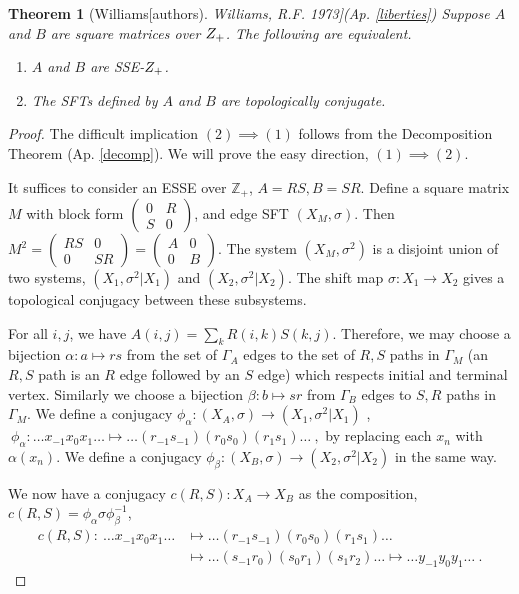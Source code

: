 \documentclass{amsart}
\newcommand{\si}{\index}
\newcommand{\ai}{\index[authors]}
\newtheorem{thm}[equation]{Theorem}
\theoremstyle{definition}
\theoremstyle{definition}
\newcommand{\apr}{(Ap. \ref}
\newcommand{\Z}{\mathbb Z}
\numberwithin{equation}{subsection}
\begin{document}
 \begin{thm}[Williams\ai{Williams, R.F.} 1973]\label{rfwtheorem} \apr{liberties}) Suppose
 $A$ and $B$ are square matrices over $\mathcal \Z_+$. The following
are equivalent.
\begin{enumerate}
\item  $A$ and $B$ are SSE-$\mathcal \Z_+$.

\item The SFTs defined by $A$ and $B$ are topologically conjugate.
\end{enumerate}
\end{thm}
\begin{proof}
The  difficult implication $(2) \implies (1)$ follows from
the Decomposition Theorem\si{Decomposition Theorem} \apr{decomp}).
We will prove the easy direction,
$(1) \implies (2)$.

It suffices to consider
 an ESSE over $\Z_+$,
   $A=RS, B=SR$. Define a square matrix $M$ with block form
   $\begin{pmatrix} 0&R \\ S&0\end{pmatrix}$,
     and  edge SFT $(X_M, \sigma)$.
Then $M^2 =
     \begin{pmatrix} RS&0 \\ 0&SR\end{pmatrix}
=    \begin{pmatrix} A&0 \\ 0&B\end{pmatrix}
  $.
  The system $(X_M, \sigma^2)$ is a disjoint union of two systems,
  $(X_1, \sigma^2|{X_1})$ and   $(X_2, \sigma^2|{X_2})$.
The shift map
  $\sigma: X_1 \to X_2$ gives a
  topological conjugacy between these subsystems.

For all $i,j$, we have $A(i,j)= \sum_k R(i,k)S(k,j)$.
Therefore, we may choose a bijection $\alpha: a\mapsto rs$ from the set of
$\Gamma_A$ edges to the set of $R,S $ paths in $\Gamma_M$
(an $R,S$ path is an $R$ edge followed
by an $S$ edge) which respects initial and terminal vertex.
Similarly we choose a bijection
$\beta: b\mapsto sr$
from $\Gamma_B$ edges to $S,R$ paths in $\Gamma_M$.
  We define a  conjugacy
$\phi_{\alpha}: (X_A, \sigma ) \to (X_1, \sigma^2|{X_1})$ ,
$\
\phi_{\alpha} :
  \dots x_{-1}x_0x_1 \dots  \mapsto
  \dots (r_{-1}s_{-1})(r_0s_0)(r_1s_1) \dots \ ,
 $
  by replacing
  each $x_n$ with $\alpha (x_n)$.
    We define a  conjugacy
  $\phi_{\beta}: (X_B, \sigma ) \to (X_2, \sigma^2|{X_2})$ in
  the same way.

We now have a conjugacy $c(R,S):X_A \to X_B$
as the composition, $c(R,S) = \phi_{\alpha} \sigma \phi_{\beta}^{-1}$,
\begin{align*}
c(R,S): \   \dots x_{-1}x_0x_1 \dots & \mapsto
  \dots (r_{-1}s_{-1})(r_0s_0)(r_1s_1) \dots \\
  & \mapsto
  \dots (s_{-1}r_0)(s_0r_1)(s_1r_2) \dots \mapsto
   \dots y_{-1}y_0y_1 \dots \ .
\end{align*}
\end{proof}
\end{document}
